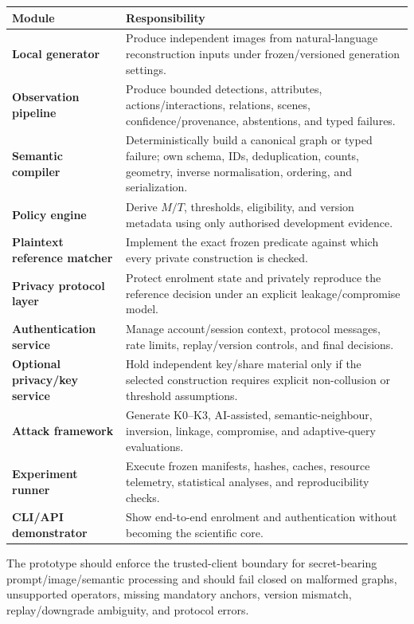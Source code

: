 \documentclass[11pt,a4paper]{article}
\begin{document}
\begin{center}
\begin{tabularx}{\textwidth}{>{\bfseries}p{} X}
\toprule
Module & Responsibility \\
\midrule
Local generator & Produce independent images from natural-language reconstruction inputs under frozen/versioned generation settings. \\
Observation pipeline & Produce bounded detections, attributes, actions/interactions, relations, scenes, confidence/provenance, abstentions, and typed failures. \\
Semantic compiler & Deterministically build a canonical graph or typed failure; own schema, IDs, deduplication, counts, geometry, inverse normalisation, ordering, and serialization. \\
Policy engine & Derive $M/T$, thresholds, eligibility, and version metadata using only authorised development evidence. \\
Plaintext reference matcher & Implement the exact frozen predicate against which every private construction is checked. \\
Privacy protocol layer & Protect enrolment state and privately reproduce the reference decision under an explicit leakage/compromise model. \\
Authentication service & Manage account/session context, protocol messages, rate limits, replay/version controls, and final decisions. \\
Optional privacy/key service & Hold independent key/share material only if the selected construction requires explicit non-collusion or threshold assumptions. \\
Attack framework & Generate K0--K3, AI-assisted, semantic-neighbour, inversion, linkage, compromise, and adaptive-query evaluations. \\
Experiment runner & Execute frozen manifests, hashes, caches, resource telemetry, statistical analyses, and reproducibility checks. \\
CLI/API demonstrator & Show end-to-end enrolment and authentication without becoming the scientific core. \\
\bottomrule
\end{tabularx}
\end{center}

The prototype should enforce the trusted-client boundary for secret-bearing prompt/image/semantic processing and should fail closed on malformed graphs, unsupported operators, missing mandatory anchors, version mismatch, replay/downgrade ambiguity, and protocol errors.
\end{document}

